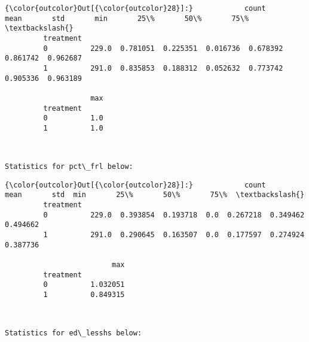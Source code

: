 \documentclass[11pt]{article}
\begin{document}
\begin{Verbatim}[commandchars=\\\{\}]
{\color{outcolor}Out[{\color{outcolor}28}]:}            count      mean       std       min       25\%       50\%       75\%  \textbackslash{}
         treatment                                                                      
         0          229.0  0.781051  0.225351  0.016736  0.678392  0.861742  0.962687   
         1          291.0  0.835853  0.188312  0.052632  0.773742  0.905336  0.963189   
         
                    max  
         treatment       
         0          1.0  
         1          1.0  
\end{Verbatim}
            
    \begin{center}
    \end{center}
    { \hspace*{\fill} \\}
    
    \begin{Verbatim}[commandchars=\\\{\}]
Statistics for pct\_frl below:

    \end{Verbatim}

\begin{Verbatim}[commandchars=\\\{\}]
{\color{outcolor}Out[{\color{outcolor}28}]:}            count      mean       std  min       25\%       50\%       75\%  \textbackslash{}
         treatment                                                                 
         0          229.0  0.393854  0.193718  0.0  0.267218  0.349462  0.494662   
         1          291.0  0.290645  0.163507  0.0  0.177597  0.274924  0.387736   
         
                         max  
         treatment            
         0          1.032051  
         1          0.849315  
\end{Verbatim}
            
    \begin{center}
    \end{center}
    { \hspace*{\fill} \\}
    
    \begin{Verbatim}[commandchars=\\\{\}]
Statistics for ed\_lesshs below:

    \end{Verbatim}
\end{document}
